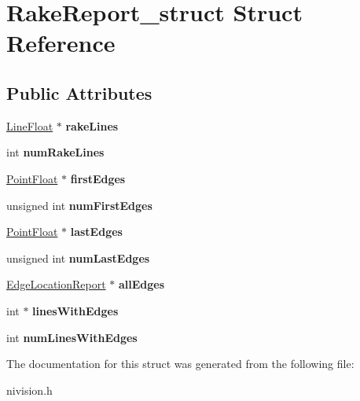 \hypertarget{structRakeReport__struct}{
\section{RakeReport\_\-struct Struct Reference}
\label{structRakeReport__struct}
}
\subsection*{Public Attributes}
\begin{DoxyCompactItemize}
\item 
\hypertarget{structRakeReport__struct_a276bba2b546a316be66d5e752a305bc9}{
\hyperlink{structLineFloat__struct}{LineFloat} $\ast$ {\bfseries rakeLines}}
\label{structRakeReport__struct_a276bba2b546a316be66d5e752a305bc9}

\item 
\hypertarget{structRakeReport__struct_afddc894d706aaebec5d45d087aa1ed3c}{
int {\bfseries numRakeLines}}
\label{structRakeReport__struct_afddc894d706aaebec5d45d087aa1ed3c}

\item 
\hypertarget{structRakeReport__struct_ac42787ae1e409a510756bbe14e24ad09}{
\hyperlink{structPointFloat__struct}{PointFloat} $\ast$ {\bfseries firstEdges}}
\label{structRakeReport__struct_ac42787ae1e409a510756bbe14e24ad09}

\item 
\hypertarget{structRakeReport__struct_ab037f1b1f28514231ff44f99e2f6457b}{
unsigned int {\bfseries numFirstEdges}}
\label{structRakeReport__struct_ab037f1b1f28514231ff44f99e2f6457b}

\item 
\hypertarget{structRakeReport__struct_a02baaf2e3560e8054f9ccb9cd397f7c2}{
\hyperlink{structPointFloat__struct}{PointFloat} $\ast$ {\bfseries lastEdges}}
\label{structRakeReport__struct_a02baaf2e3560e8054f9ccb9cd397f7c2}

\item 
\hypertarget{structRakeReport__struct_a5a8f3e5b0e91f779d1f5cc67f46b6f2c}{
unsigned int {\bfseries numLastEdges}}
\label{structRakeReport__struct_a5a8f3e5b0e91f779d1f5cc67f46b6f2c}

\item 
\hypertarget{structRakeReport__struct_a6d306895c02ccdf39974d8b904e7577b}{
\hyperlink{structEdgeLocationReport__struct}{EdgeLocationReport} $\ast$ {\bfseries allEdges}}
\label{structRakeReport__struct_a6d306895c02ccdf39974d8b904e7577b}

\item 
\hypertarget{structRakeReport__struct_a6d2d096ac0ee72cefc33bd88103a6e7f}{
int $\ast$ {\bfseries linesWithEdges}}
\label{structRakeReport__struct_a6d2d096ac0ee72cefc33bd88103a6e7f}

\item 
\hypertarget{structRakeReport__struct_a13da20574b34e761cc41b2faca627b24}{
int {\bfseries numLinesWithEdges}}
\label{structRakeReport__struct_a13da20574b34e761cc41b2faca627b24}

\end{DoxyCompactItemize}


The documentation for this struct was generated from the following file:\begin{DoxyCompactItemize}
\item 
nivision.h\end{DoxyCompactItemize}
